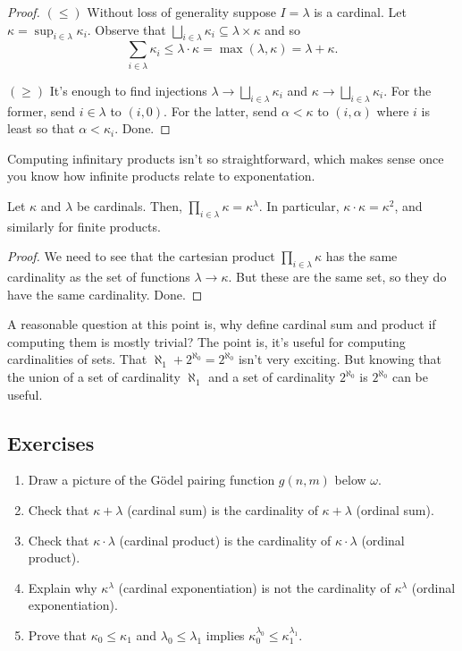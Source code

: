 \documentclass[10pt]{amsart}
\begin{document}
\begin{proof}
$(\le)$ Without loss of generality suppose $I = \lambda$ is a cardinal.
Let $\kappa = \sup_{i \in \lambda} \kappa_i$. Observe that $\bigsqcup_{i \in \lambda} \kappa_i \subseteq \lambda \times \kappa$ and so
\[
\sum_{i \in \lambda} \kappa_i \le \lambda \cdot \kappa = \max(\lambda,\kappa) = \lambda + \kappa.
\]

$(\ge)$ It's enough to find injections $\lambda \to \bigsqcup_{i \in \lambda} \kappa_i$ and $\kappa \to \bigsqcup_{i \in \lambda} \kappa_i$. For the former, send $i \in \lambda$ to $(i,0)$. For the latter, send $\alpha < \kappa$ to $(i,\alpha)$ where $i$ is least so that $\alpha < \kappa_i$. Done.
\end{proof}

Computing infinitary products isn't so straightforward, which makes sense once you know how infinite products relate to exponentation.

\begin{proposition}
Let $\kappa$ and $\lambda$ be cardinals. Then, $\prod_{i \in \lambda} \kappa = \kappa^\lambda$. In particular, $\kappa \cdot \kappa = \kappa^2$, and similarly for finite products.
\end{proposition}

\begin{proof}
We need to see that the cartesian product $\prod_{i \in \lambda} \kappa$ has the same cardinality as the set of functions $\lambda \to \kappa$. But these are the same set, so they do have the same cardinality. Done.
\end{proof}

A reasonable question at this point is, why define cardinal sum and product if computing them is mostly trivial? The point is, it's useful for computing cardinalities of sets. That $\aleph_1 + 2^{\aleph_0} = 2^{\aleph_0}$ isn't very exciting. But knowing that the union of a set of cardinality $\aleph_1$ and a set of cardinality $2^{\aleph_0}$ is $2^{\aleph_0}$ can be useful.

\subsection*{Exercises}

\begin{enumerate}
\item Draw a picture of the G\"odel pairing function $g(n,m)$ below $\omega$.
\item Check that $\kappa + \lambda$ (cardinal sum) is the cardinality of $\kappa + \lambda$ (ordinal sum).
\item Check that $\kappa \cdot \lambda$ (cardinal product) is the cardinality of $\kappa \cdot \lambda$ (ordinal product).
\item Explain why $\kappa^\lambda$ (cardinal exponentiation) is not the cardinality of $\kappa^\lambda$ (ordinal exponentiation).
\item Prove that $\kappa_0 \le \kappa_1$ and $\lambda_0 \le \lambda_1$ implies $\kappa_0^{\lambda_0} \le \kappa_1^{\lambda_1}$.
\end{enumerate}
\end{document}
